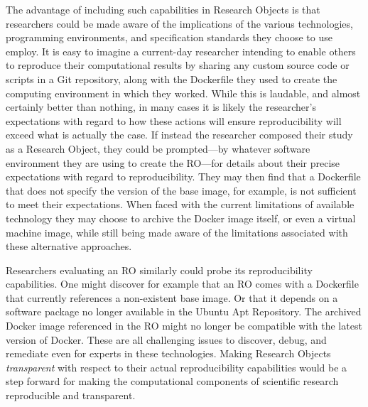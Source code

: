 The advantage of including such capabilities in Research Objects is that researchers could be made aware
	of the implications of the various technologies, programming environments, and specification
	standards they choose to use employ.
It is easy to imagine a current-day researcher intending to enable others to reproduce their computational
	results by sharing any custom source code or scripts in a Git repository, along with the Dockerfile
	they used to create the computing environment in which they worked.
While this is laudable, and almost certainly better than nothing, in many cases it is likely the researcher's
	expectations with regard to how these actions will ensure reproducibility will exceed
	what is actually the case.
If instead the researcher composed their study as a Research Object, they could be prompted---by whatever
	software environment they are using to create the RO---for details about their precise expectations with
	regard to reproducibility.
They may then find that a Dockerfile that does not specify the version of the base image, for example, is not sufficient
	to meet their expectations.
When faced with the current limitations of available technology they may choose to archive the Docker image itself,
	or even a virtual machine image, while still being made aware of the limitations associated with these alternative
	approaches.

Researchers evaluating an RO similarly could probe its reproducibility capabilities.  One might discover for example
	that an RO comes with a Dockerfile that currently references a non-existent base image.
Or that it depends on a software package no longer available in the Ubuntu Apt Repository.
The archived Docker image referenced in the RO might no longer be compatible with the latest version of Docker.
These are all challenging issues to discover, debug, and remediate even for experts in these technologies.
Making Research Objects \emph{transparent} with respect to their actual reproducibility capabilities would be a
	step forward for making the computational components of scientific research reproducible and
	transparent.



